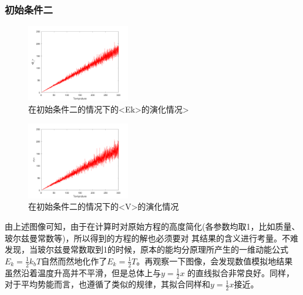 \documentclass[UTF8,a4paper,10pt]{ctexart}
\begin{document}
\subsubsection{初始条件二}
\begin{figure}[!htbp]
    \centering
    \includegraphics[width=0.4\textwidth,height=0.3\textwidth]{pictures/ek2.png}
    \caption{在初始条件二的情况下的<Ek>的演化情况>} \label{ek2}
\end{figure}
\begin{figure}[!htbp]
    \centering
    \includegraphics[width=0.4\textwidth,height=0.3\textwidth]{pictures/v2.png}
    \caption{在初始条件二的情况下的<V>的演化情况} \label{v2}
\end{figure}
\quad \newline
由上述图像可知，由于在计算时对原始方程的高度简化(各参数均取1，比如质量、玻尔兹曼常数等)，所以得到的方程的解也必须要对
其结果的含义进行考量。不难发现，当玻尔兹曼常数取到1的时候，原本的能均分原理所产生的一维动能公式
$E_{k}=\frac{1}{2}k_{b}T$自然而然地化作了$E_{k}=\frac{1}{2}T$。再观察一下图像，会发现数值模拟地结果虽然沿着温度升高并不平滑，但是总体上与$y=\frac{1}{2}x$
的直线拟合非常良好。同样，对于平均势能而言，也遵循了类似的规律，其拟合同样和$y=\frac{1}{2}x$接近。

\
\end{document}
